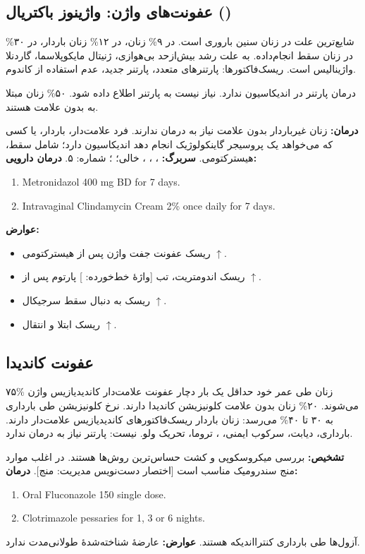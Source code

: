 \documentclass[12pt,a4paper]{article}
\begin{document}
\subsection*{عفونت‌های واژن: واژینوز باکتریال ()}
شایع‌ترین علت  در زنان سنین باروری است.
در ۹\% زنان، در ۱۲\% زنان باردار، در ۳۰\% در زنان سقط انجام‌داده.
به علت رشد بیش‌ازحد بی‌هوازی، ژنیتال مایکوپلاسما، گاردنلا واژینالیس است.
ریسک‌فاکتورها: پارتنرهای متعدد، پارتنر جدید، عدم استفاده از کاندوم.

درمان پارتنر در  اندیکاسیون ندارد.
نیاز نیست به پارتنر اطلاع داده شود.
۵۰\% زنان مبتلا به  بدون علامت هستند.

\textbf{درمان:} زنان غیرباردار بدون علامت نیاز به درمان ندارند.
فرد علامت‌دار، باردار، یا کسی که می‌خواهد یک پروسیجر گاینکولوژیک انجام دهد اندیکاسیون دارد؛ شامل سقط، هیسترکتومی.
\textbf{سربرگ:} ، ، ،  خالی؛ ؛ شماره: ۵.
\textbf{درمان دارویی:}
\begin{latin}\begin{enumerate}
\item Metronidazol 400 mg BD for 7 days.
\item Intravaginal Clindamycin Cream 2\% once daily for 7 days.
\end{enumerate}\end{latin}
\textbf{عوارض:}
\begin{itemize}
\item ریسک عفونت جفت واژن پس از هیسترکتومی $\uparrow$.
\item ریسک اندومتریت، تب [واژهٔ خط‌خورده: ] پارتوم پس از  $\uparrow$.
\item ریسک  به دنبال سقط سرجیکال $\uparrow$.
\item ریسک ابتلا و انتقال  $\uparrow$.
\end{itemize}
\subsection*{عفونت کاندیدا}
۷۵\% زنان طی عمر خود حداقل یک بار دچار عفونت علامت‌دار کاندیدیازیس واژن می‌شوند.
۲۰\% زنان بدون علامت کلونیزیشن کاندیدا دارند.
نرخ کلونیزیشن طی بارداری به ۳۰ تا ۴۰\% می‌رسد: زنان باردار ریسک‌فاکتورهای کاندیدیازیس علامت‌دار دارند.
بارداری، دیابت، سرکوب ایمنی، ، تروما، تحریک ولو.
 نیست: پارتنر نیاز به درمان ندارد.

\textbf{تشخیص:} بررسی میکروسکوپی و کشت حساس‌ترین روش‌ها هستند.
در اغلب موارد منج سندرومیک مناسب است [اختصار دست‌نویس مدیریت: منج].
\textbf{درمان:}
\begin{latin}\begin{enumerate}
\item Oral Fluconazole 150 single dose.
\item Clotrimazole pessaries for 1, 3 or 6 nights.
\end{enumerate}\end{latin}
آزول‌ها طی بارداری کنترااندیکه هستند.
\textbf{عوارض:} عارضهٔ شناخته‌شدهٔ طولانی‌مدت ندارد.
\end{document}
